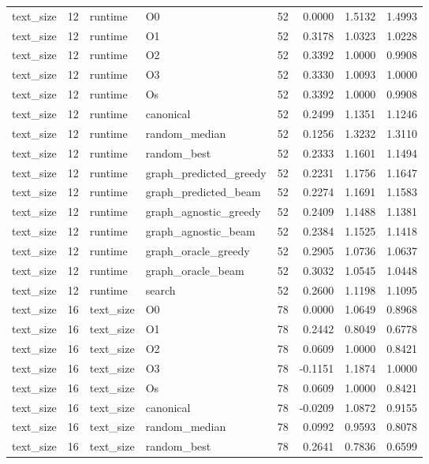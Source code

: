 \begin{table}[t]
\begin{tabular}{lrllrrrr}
text\_size & 12 & runtime & O0 & 52 & 0.0000 & 1.5132 & 1.4993 \\
text\_size & 12 & runtime & O1 & 52 & 0.3178 & 1.0323 & 1.0228 \\
text\_size & 12 & runtime & O2 & 52 & 0.3392 & 1.0000 & 0.9908 \\
text\_size & 12 & runtime & O3 & 52 & 0.3330 & 1.0093 & 1.0000 \\
text\_size & 12 & runtime & Os & 52 & 0.3392 & 1.0000 & 0.9908 \\
text\_size & 12 & runtime & canonical & 52 & 0.2499 & 1.1351 & 1.1246 \\
text\_size & 12 & runtime & random\_median & 52 & 0.1256 & 1.3232 & 1.3110 \\
text\_size & 12 & runtime & random\_best & 52 & 0.2333 & 1.1601 & 1.1494 \\
text\_size & 12 & runtime & graph\_predicted\_greedy & 52 & 0.2231 & 1.1756 & 1.1647 \\
text\_size & 12 & runtime & graph\_predicted\_beam & 52 & 0.2274 & 1.1691 & 1.1583 \\
text\_size & 12 & runtime & graph\_agnostic\_greedy & 52 & 0.2409 & 1.1488 & 1.1381 \\
text\_size & 12 & runtime & graph\_agnostic\_beam & 52 & 0.2384 & 1.1525 & 1.1418 \\
text\_size & 12 & runtime & graph\_oracle\_greedy & 52 & 0.2905 & 1.0736 & 1.0637 \\
text\_size & 12 & runtime & graph\_oracle\_beam & 52 & 0.3032 & 1.0545 & 1.0448 \\
text\_size & 12 & runtime & search & 52 & 0.2600 & 1.1198 & 1.1095 \\
text\_size & 16 & text\_size & O0 & 78 & 0.0000 & 1.0649 & 0.8968 \\
text\_size & 16 & text\_size & O1 & 78 & 0.2442 & 0.8049 & 0.6778 \\
text\_size & 16 & text\_size & O2 & 78 & 0.0609 & 1.0000 & 0.8421 \\
text\_size & 16 & text\_size & O3 & 78 & -0.1151 & 1.1874 & 1.0000 \\
text\_size & 16 & text\_size & Os & 78 & 0.0609 & 1.0000 & 0.8421 \\
text\_size & 16 & text\_size & canonical & 78 & -0.0209 & 1.0872 & 0.9155 \\
text\_size & 16 & text\_size & random\_median & 78 & 0.0992 & 0.9593 & 0.8078 \\
text\_size & 16 & text\_size & random\_best & 78 & 0.2641 & 0.7836 & 0.6599 \\

\end{tabular}
\end{table}
